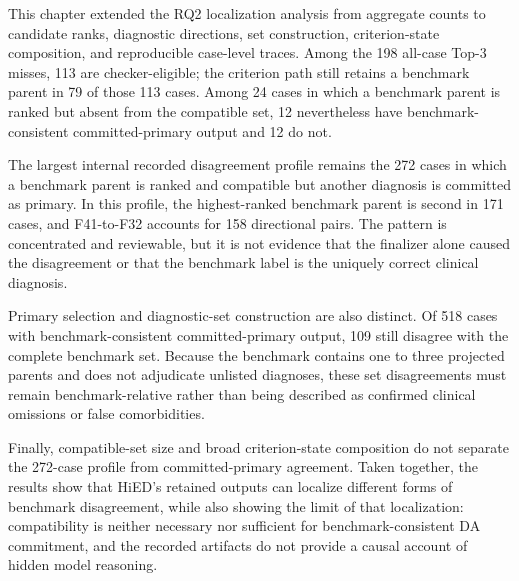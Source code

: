 This chapter extended the RQ2 localization analysis from aggregate counts to candidate ranks, diagnostic directions, set construction, criterion-state composition, and reproducible case-level traces. Among the 198 all-case Top-3 misses, 113 are checker-eligible; the criterion path still retains a benchmark parent in 79 of those 113 cases. Among 24 cases in which a benchmark parent is ranked but absent from the compatible set, 12 nevertheless have benchmark-consistent committed-primary output and 12 do not.

The largest internal recorded disagreement profile remains the 272 cases in which a benchmark parent is ranked and compatible but another diagnosis is committed as primary. In this profile, the highest-ranked benchmark parent is second in 171 cases, and F41-to-F32 accounts for 158 directional pairs. The pattern is concentrated and reviewable, but it is not evidence that the finalizer alone caused the disagreement or that the benchmark label is the uniquely correct clinical diagnosis.

Primary selection and diagnostic-set construction are also distinct. Of 518 cases with benchmark-consistent committed-primary output, 109 still disagree with the complete benchmark set. Because the benchmark contains one to three projected parents and does not adjudicate unlisted diagnoses, these set disagreements must remain benchmark-relative rather than being described as confirmed clinical omissions or false comorbidities.

Finally, compatible-set size and broad criterion-state composition do not separate the 272-case profile from committed-primary agreement. Taken together, the results show that HiED's retained outputs can localize different forms of benchmark disagreement, while also showing the limit of that localization: compatibility is neither necessary nor sufficient for benchmark-consistent DA commitment, and the recorded artifacts do not provide a causal account of hidden model reasoning.
